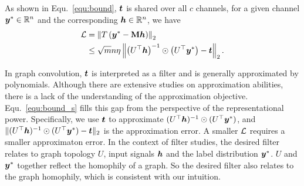 \documentclass{article} %
\begin{document}
As shown in Equ.~\ref{equ:bound}, ${\bm{t}}$ is shared over all $c$ channels, for a given channel ${\bm{y}}^*\in{\mathbb{R}}^n$ and the corresponding ${\bm{h}}\in{\mathbb{R}}^n$, we have
\begin{equation}
	\label{equ:bound_s}
	\begin{aligned}
		{\mathcal{L}}&=\left\|T\left({\bm{y}}^*-{\mathbf{M}}{\bm{h}}\right)\right\|_2\\
		&\leq\sqrt{m}n\eta\left\|\left(U^{\top}{\bm{h}}\right)^{-1}\odot\left(U^{\top}{\bm{y}}^*\right)-{\bm{t}}\right\|_2.
	\end{aligned}
\end{equation}

In graph convolution, ${\bm{t}}$ is interpreted as a filter and is generally approximated by polynomials.
Although there are extensive studies on approximation abilities, there is a lack of the understanding of the approximation objective.
Equ.~\ref{equ:bound_s} fills this gap from the perspective of the representational power.
Specifically, we use ${\bm{t}}$ to approximate $(U^{\top}{\bm{h}})^{-1}\odot(U^{\top}{\bm{y}}^*)$, and $\|(U^{\top}{\bm{h}})^{-1}\odot(U^{\top}{\bm{y}}^*)-{\bm{t}}\|_2$ is the approximation error.
A smaller ${\mathcal{L}}$ requires a smaller approximaton error.
In the context of filter studies, the desired filter relates to graph topology $U$, input signals ${\bm{h}}$ and the label distribution ${\bm{y}}^*$.
$U$ and ${\bm{y}}^*$ together reflect the homophily of a graph.
So the desired filter also relates to the graph homophily, which is consistent with our intuition.
\end{document}
